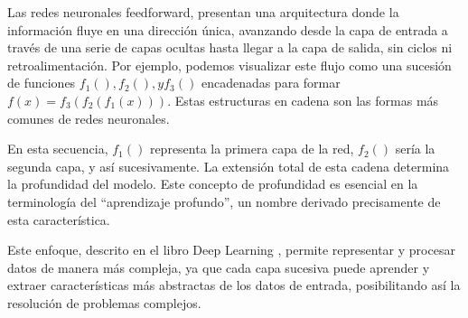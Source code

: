 Las redes neuronales feedforward, presentan una arquitectura donde la información fluye en una dirección única, avanzando desde la capa de entrada a través de una serie de capas ocultas hasta llegar a la capa de salida, sin ciclos ni retroalimentación. Por ejemplo, podemos visualizar este flujo como una sucesión de funciones $f_1(), f_2(), y f_3()$ encadenadas para formar $f(x) = f_3(f_2(f_1(x)))$. Estas estructuras en cadena son las formas más comunes de redes neuronales.

En esta secuencia, $f_1()$ representa la primera capa de la red, $f_2()$ sería la segunda capa, y así sucesivamente. La extensión total de esta cadena determina la profundidad del modelo. Este concepto de profundidad es esencial en la terminología del ``aprendizaje profundo'', un nombre derivado precisamente de esta característica.

Este enfoque, descrito en el libro Deep Learning \cite[p.167]{goodfellow2016deep}, permite representar y procesar datos de manera más compleja, ya que cada capa sucesiva puede aprender y extraer características más abstractas de los datos de entrada, posibilitando así la resolución de problemas complejos.

